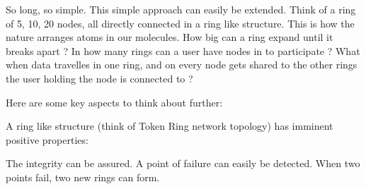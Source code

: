 So long, so simple. This simple approach can easily be extended. Think
of a ring of 5, 10, 20 nodes, all directly connected in a ring like
structure. This is how the nature arranges atoms in our molecules. How
big can a ring expand until it breaks apart ? In how many rings can a
user have nodes in to participate ? What when data travelles in one
ring, and on every node gets shared to the other rings the user holding
the node is connected to ?

Here are some key aspects to think about further:

A ring like structure (think of Token Ring network topology) has imminent positive properties:

The integrity can be assured.
A point of failure can easily be detected.
When two points fail, two new rings can form.

